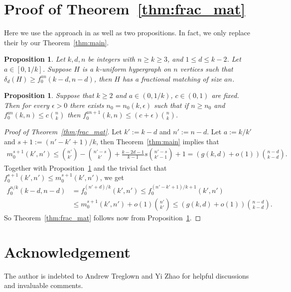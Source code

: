\documentclass{amsart}
\theoremstyle{plain}
\newtheorem{proposition}[theorem]{Proposition}
\numberwithin{equation}{section}
\numberwithin{theorem}{section}
\numberwithin{case}{section}
\numberwithin{subcase}{case}
\begin{document}
\section{Proof of Theorem~\ref{thm:frac_mat}}

Here we use the approach in \cite{KOTo} as well as two propositions. In fact, we only replace their \cite[Theorem 1.8]{KOTo} by our Theorem~\ref{thm:main}.

\begin{proposition}\cite[Proposition 4.1]{KOTo}\label{prop:41}
Let $k, d, n$ be integers with $n\ge k\ge 3$, and $1\le d\le k-2$.
Let $a\in [0, 1/k]$.
Suppose $H$ is a $k$-uniform hypergraph on $n$ vertices such that $\delta_d(H)\ge f_0^{a n}(k-d, n-d)$, then $H$ has a fractional matching of size $a n$.
\end{proposition}

\begin{proposition}\cite[Proposition 2.3]{KOTo}\label{prop:23}
Suppose that $k\ge 2$ and $a\in (0, 1/k)$, $c\in (0,1)$ are fixed.
Then for every ${\epsilon}>0$ there exists $n_0=n_0(k,{\epsilon})$ such that if $n\ge n_0$ and $f_0^{a n}(k,n)\le c\binom n k$ then $f_0^{a n+1}(k,n)\le (c+{\epsilon})\binom n k$.
\end{proposition}

\begin{proof}[Proof of Theorem~\ref{thm:frac_mat}]
Let $k':=k-d$ and $n':=n-d$. Let $a:=k/k'$ and $s+1:=(n'-k'+1)/k$, then Theorem~\ref{thm:main} implies that
\begin{align*}
m_0^{s+1}(k', n') \le \binom {n'}{k'} - \binom{n'-s}{k'} + \frac{k-2 d-1}{k-1} s \binom{n'-s}{k'-1}+1  = \left( g(k,d) +o(1)\right) \binom{n-d}{k-d}.
\end{align*}
Together with Proposition~\ref{prop:23} and the trivial fact that $f_0^{s+1}(k', n')\le m_0^{s+1}(k', n')$, we get
\begin{align*}
f_0^{n/k}(k-d, n-d) &=f_0^{(n'+d)/k}(k', n')\le f_0^{(n'-k'+1)/k+1}(k',n') \\
&\le m_0^{s+1}(k', n')+o(1)\binom{n'}{k'} \le \left( g(k,d) +o(1)\right) \binom{n-d}{k-d}.
\end{align*}
So Theorem~\ref{thm:frac_mat} follows now from Proposition~\ref{prop:41}.
\end{proof}

\section{Acknowledgement}

The author is indebted to Andrew Treglown and Yi Zhao for helpful discussions and invaluable comments.



\end{document}
